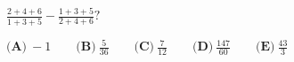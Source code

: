 \documentclass[preview]{standalone}
\begin{document}
\color{white}
$\frac{2+4+6}{1+3+5}-\frac{1+3+5}{2+4+6}?$



$\textbf{(A)}\ -1 \qquad \textbf{(B)}\ \frac{5}{36} \qquad \textbf{(C)}\ \frac{7}{12} \qquad \textbf{(D)}\ \frac{147}{60} \qquad \textbf{(E)}\ \frac{43}{3}$
\end{document}

